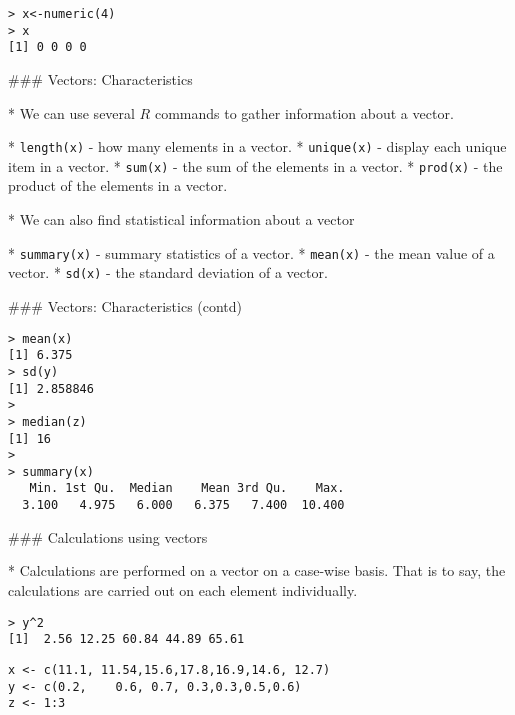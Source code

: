 \begin{frame}[fragile]
\begin{itemize}
\begin{framed}
\begin{verbatim}
> x<-numeric(4)
> x
[1] 0 0 0 0
\end{verbatim}
\end{framed}



### {Vectors: Characteristics}


*  We can use several $R$ commands to gather information about
a vector.


*  \texttt{length(x)} - how many elements in a vector.  
*  \texttt{unique(x)} - display each unique item in a vector.  
*  \texttt{sum(x)} - the sum of the elements in a vector. 
*  \texttt{prod(x)} - the product of the elements in a vector.


*  We can also find statistical information about a vector

*  \texttt{summary(x)} - summary statistics of a vector.  *  \texttt{mean(x)} -
the mean value of a vector. *  \texttt{sd(x)} -  the standard deviation
of a vector.




### {Vectors: Characteristics (contd)}



\begin{framed}
\begin{verbatim}
> mean(x)
[1] 6.375
> sd(y)
[1] 2.858846
>
> median(z)
[1] 16
>
> summary(x)
   Min. 1st Qu.  Median    Mean 3rd Qu.    Max.
  3.100   4.975   6.000   6.375   7.400  10.400
\end{verbatim}
\end{framed}


### {Calculations using vectors}


*  Calculations are performed on a vector on a case-wise basis.
That is to say, the calculations are carried out on each element individually.
\begin{verbatim}
> y^2
[1]  2.56 12.25 60.84 44.89 65.61
\end{verbatim}

\begin{framed}
\begin{verbatim}
x <- c(11.1, 11.54,15.6,17.8,16.9,14.6, 12.7)
y <- c(0.2,    0.6, 0.7, 0.3,0.3,0.5,0.6)
z <- 1:3
\end{verbatim}
\end{framed}




\end{itemize}
\end{frame}
